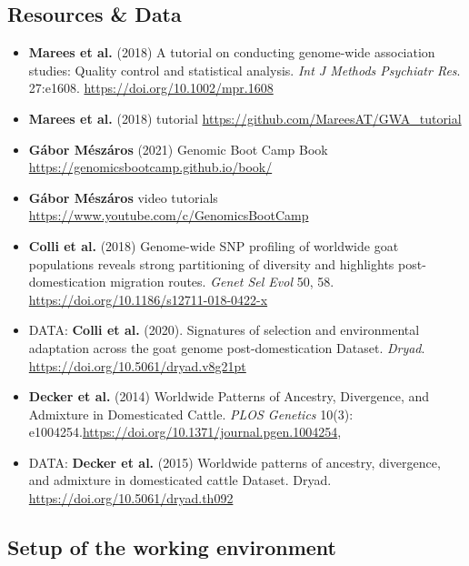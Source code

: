 \hypertarget{resources-data}{%
  \subsection{Resources \& Data}\label{resources-data}}

\begin{itemize}
  \item
        \textbf{Marees et al.} (2018) A tutorial on conducting genome-wide
        association studies: Quality control and statistical analysis.
        \emph{Int J Methods Psychiatr Res}. 27:e1608.
        \url{https://doi.org/10.1002/mpr.1608}
  \item
        \textbf{Marees et al.} (2018) tutorial
        \url{https://github.com/MareesAT/GWA_tutorial}
  \item
        \textbf{Gábor Mészáros} (2021) Genomic Boot Camp Book
        \url{https://genomicsbootcamp.github.io/book/}
  \item
        \textbf{Gábor Mészáros} video tutorials
        \url{https://www.youtube.com/c/GenomicsBootCamp}
  \item
        \textbf{Colli et al.} (2018) Genome-wide SNP profiling of worldwide
        goat populations reveals strong partitioning of diversity and
        highlights post-domestication migration routes. \emph{Genet Sel Evol}
        50, 58. \url{https://doi.org/10.1186/s12711-018-0422-x}
  \item
        DATA: \textbf{Colli et al.} (2020). Signatures of selection and
        environmental adaptation across the goat genome post-domestication
        {}Dataset{}. \emph{Dryad}.
        \url{https://doi.org/10.5061/dryad.v8g21pt}
  \item
        \textbf{Decker et al.} (2014) Worldwide Patterns of Ancestry,
        Divergence, and Admixture in Domesticated Cattle. \emph{PLOS Genetics}
        10(3):
        e1004254.\href{https://journals.plos.org/plosgenetics/article?id=10.1371/journal.pgen.1004254}{https://doi.org/10.1371/journal.pgen.1004254},
  \item
        DATA: \textbf{Decker et al.} (2015) Worldwide patterns of ancestry,
        divergence, and admixture in domesticated cattle {}Dataset{}. Dryad.
        \url{https://doi.org/10.5061/dryad.th092}
\end{itemize}

\hypertarget{setup-of-the-working-environment}{%
  \subsection{Setup of the working
    environment}\label{setup-of-the-working-environment}}

